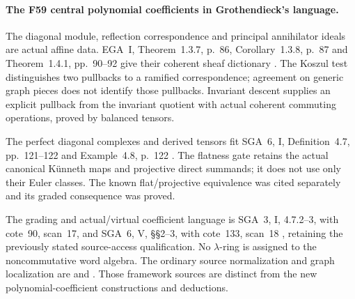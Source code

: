 \paragraph{The F59 central polynomial coefficients in Grothendieck's language.}
The diagonal module, reflection correspondence and
principal annihilator ideals are actual affine data.
EGA~I, Theorem~1.3.7, p.~86, Corollary~1.3.8,
p.~87 and Theorem~1.4.1, pp.~90--92 give their
coherent sheaf dictionary \cite{EGA}.
The Koszul test distinguishes two pullbacks to a
ramified correspondence; agreement on generic
graph pieces does not identify those pullbacks.
Invariant descent supplies an explicit pullback
from the invariant quotient with actual coherent
commuting operations, proved by balanced tensors.

The perfect diagonal complexes and derived tensors
fit SGA~6, I, Definition~4.7, pp.~121--122 and
Example~4.8, p.~122 \cite{SGA6}.
The flatness gate retains the actual canonical
K\"unneth maps and projective direct summands;
it does not use only their Euler classes.
The known flat/projective equivalence was cited
separately and its graded consequence was proved.

The grading and actual/virtual coefficient language
is SGA~3, I, 4.7.2--3, with cote~90, scan~17,
and SGA~6, V, \S\S2--3, with cote~133, scan~18
\cite{SGA3,SGA6,Archive}, retaining the previously
stated source-access qualification.
No \(\lambda\)-ring is assigned to the noncommutative
word algebra. The ordinary source normalization
and graph localization are
\cite[\S\S3.3--3.5]{EW} and
\cite[\S\S1.1--1.2, Theorem~1.6 and Remark~1.7]{EWLocalized}.
Those framework sources are distinct from the new
polynomial-coefficient constructions and deductions.
